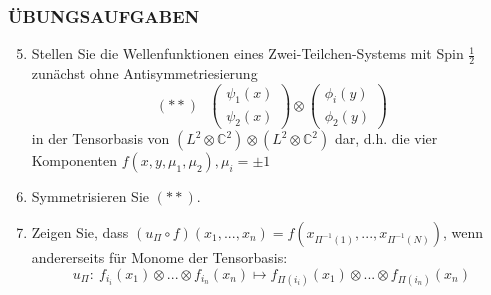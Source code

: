 \documentclass[twoside,a4paper]{scrartcl}
\newcommand{\C}{\mathbb{C}}
\renewcommand{\1}{\mathds{1}}
\renewcommand{\C}{\mathbb{C}}
\begin{document}
\subsubsection*{ÜBUNGSAUFGABEN}
\begin{enumerate}
\setcounter{enumi}{4}
\item Stellen Sie die Wellenfunktionen eines Zwei-Teilchen-Systems mit Spin $\frac{1}{2}$ zunächst ohne Antisymmetriesierung 
$$(**) \ \  \ \begin{pmatrix} \psi_1(x) \\ \psi_2(x)\end{pmatrix} \otimes \begin{pmatrix} \phi_i(y) \\ \phi_2(y)\end{pmatrix}$$
in der Tensorbasis von $(L^2\otimes \C^2)\otimes(L^2\otimes \C^2)$ dar, d.h. die vier Komponenten $f(x,y,\mu_1, \mu_2), \mu_i=\pm 1$
\item Symmetrisieren Sie $(**)$.
\item Zeigen Sie, dass $(u_\Pi\circ f)(x_1, ...,x_n)=f(x_{\Pi^{-1}(1)},...,x_{\Pi^{-1}(N)})$, wenn andererseits für Monome der Tensorbasis:
$$u_\Pi: \ f_{i_i}(x_1)\otimes... \otimes f_{i_n}(x_n) \mapsto f_{\Pi(i_i)}(x_1)\otimes... \otimes f_{\Pi(i_n)}(x_n)$$
\end{enumerate}
\end{document}
